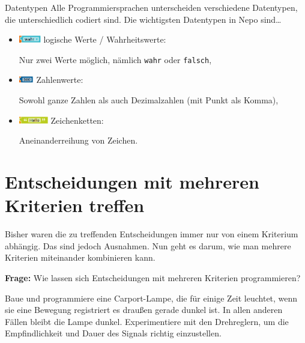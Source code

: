 \bigskip
\begin{zsfg}{Datentypen}
	Alle Programmiersprachen unterscheiden verschiedene Datentypen, die unterschiedlich codiert sind. Die wichtigsten Datentypen in Nepo sind\dots
	\begin{itemize}
		\item \includegraphics[width=0.075\textwidth]{./pics/wahrheitswertargument2.png} logische Werte / Wahrheitswerte:
		
		Nur zwei Werte möglich, nämlich \texttt{wahr} oder \texttt{falsch},
		\item \includegraphics[width=0.05\textwidth]{./pics/zahlargument1.png} Zahlenwerte: 
		
		Sowohl ganze Zahlen als auch Dezimalzahlen (mit Punkt als Komma),
		\item \includegraphics[width=0.1\textwidth]{./pics/textargument.png} Zeichenketten: 
		
		Aneinanderreihung von Zeichen.
	\end{itemize}
\end{zsfg}

\vfill

\section{Entscheidungen mit mehreren Kriterien treffen}
\label{sec:wahrheitswerte}

Bisher waren die zu treffenden Entscheidungen immer nur von einem Kriterium abhängig. Das sind jedoch Ausnahmen. Nun geht es darum, wie man mehrere Kriterien miteinander kombinieren kann.

\begin{ziel}
	\textbf{Frage:} Wie lassen sich Entscheidungen mit mehreren Kriterien programmieren?
\end{ziel}

\begin{projekt}\label{proj:carportlampe}
	Baue und programmiere eine Carport-Lampe, die für einige Zeit leuchtet, wenn sie eine Bewegung registriert  es draußen gerade dunkel ist. In allen anderen Fällen bleibt die Lampe dunkel. Experimentiere mit den Drehreglern, um die Empfindlichkeit und Dauer des Signals richtig einzustellen.
\end{projekt}

